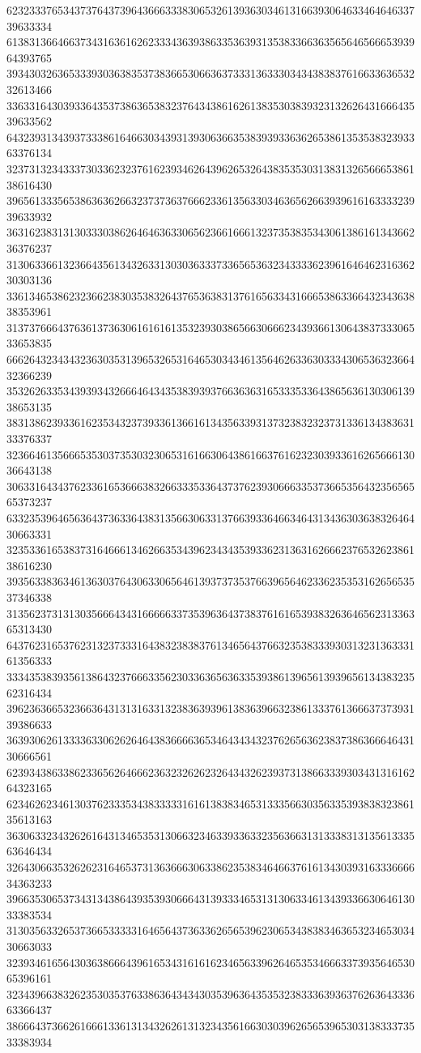 62323337653437376437396436663338306532613936303461316639306463346464633739633334
61383136646637343163616262333436393863353639313538336636356564656665393964393765
39343032636533393036383537383665306636373331363330343438383761663363653232613466
33633164303933643537386365383237643438616261383530383932313262643166643539633562
64323931343937333861646630343931393063663538393933636265386135353832393363376134
32373132343337303362323761623934626439626532643835353031383132656665386138616430
39656133356538636362663237373637666233613563303463656266393961616333323939633932
36316238313130333038626464636330656236616661323735383534306138616134366236376237
31306336613236643561343263313030363337336565363234333362396164646231636230303136
33613465386232366238303538326437653638313761656334316665386336643234363838353961
31373766643763613736306161616135323930386566306662343936613064383733306533653835
66626432343432363035313965326531646530343461356462633630333430653632366432366239
35326263353439393432666464343538393937663636316533353364386563613030613938653135
38313862393361623534323739336136616134356339313732383232373133613438363133376337
32366461356665353037353032306531616630643861663761623230393361626566613036643138
30633164343762336165366638326633353364373762393066633537366535643235656565373237
63323539646563643736336438313566306331376639336466346431343630363832646430663331
32353361653837316466613462663534396234343539336231363162666237653262386138616230
39356338363461363037643063306564613937373537663965646233623535316265653537346338
31356237313130356664343166666337353963643738376161653938326364656231336365313430
64376231653762313237333164383238383761346564376632353833393031323136333161356333
33343538393561386432376663356230336365636335393861396561393965613438323562316434
39623636653236636431313163313238363939613836396632386133376136663737393139386633
36393062613333633062626464383666636534643434323762656362383738636664643130666561
62393438633862336562646662363232626232643432623937313866333930343131616264323165
62346262346130376233353438333331616138383465313335663035633539383832386135613163
36306332343262616431346535313066323463393363323563663131333831313561333563646434
32643066353262623164653731363666306338623538346466376161343039316333666634363233
39663530653734313438643935393066643139333465313130633461343933663064613033383534
31303563326537366533333164656437363362656539623065343838346365323465303430663033
32393461656430363866643961653431616162346563396264653534666337393564653065396161
32343966383262353035376338636434343035396364353532383336393637626364333663366437
38666437366261666133613134326261313234356166303039626565396530313833373533383934
